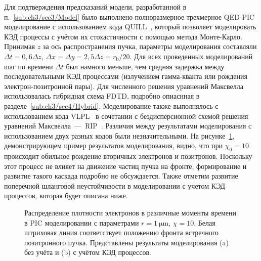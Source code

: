 Для подтверждения предсказаний модели, разработанной в п.~\ref{sub:ch3/sec3/Model} было выполнено полноразмерное трехмерное QED-PIC моделирование с использованием кода QUILL~\cite{QUILL}, который позволяет моделировать КЭД процессы с учётом их стохастичности с помощью метода Монте-Карло.
Принимая $z$ за ось распространения пучка, параметры моделирования составляли $\Delta t = 0,6 \Delta z$, $\Delta x = \Delta y = 2,5 \Delta z = r_\mathrm{b} / 20$.
Для всех проведенных моделирований шаг по времени $\Delta t$ был намного меньше, чем средняя задержка между последовательными КЭД процессами (излучением гамма-кванта или рождения электрон-позитронной пары).
Для численного решения уравнений Максвелла использовалась гибридная схема FDTD, подробно опиаснная в разделе~\ref{sub:ch3/sec4/Hybrid}.
Моделирование также выполнялось с использованием кода VLPL~\cite{pukhov1999three,NDFX,PhysRevE_94_063204} в сочетании с бездисперсионной схемой решения уравнений Максвелла~---~RIP~\cite{Pukhov2019}.
Различия между результатами моделирования с использованием двух разных кодов были незначительными.
На рисунке~\ref{fig:ch3/densities}, демонстрирующем пример результатов моделирования, видно, что при $\chi_0 = 10$ происходит обильное рождение вторичных электронов и позитронов.
Поскольку этот процесс не влияет на движение частиц пучка на фронте, формирование и развитие такого каскада подробно не обсуждается.
Также отметим развитие поперечной шланговой неустойчивости в моделировании с учетом КЭД процессов, которая будет описана ниже.

\begin{figure}[ht]
    \caption[Распределение плотности электронов в различные моменты времени в PIC моделировании столкновения электронного и позитронного пучков]{\label{fig:ch3/densities} 
    Распределение плотности электронов в различные моменты времени в PIC моделировании с параметрами $r = \SI{1}{\um}$, $\chi = 10$. 
    Белая штриховая линия соответствует положению фронта встречного позитронного пучка.
    Представлены результаты моделирования (a) без учёта и (b) с учётом КЭД процессов.}
\end{figure}

